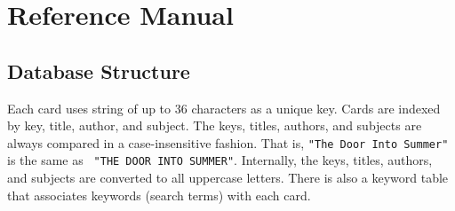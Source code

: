 \chapter{Reference Manual}
\label{chpt:Reference}

\section{Database Structure}

Each card uses string of up to 36 characters as a unique key.
Cards are indexed by key, title, author, and subject. The keys, titles,
authors, and subjects are always compared in a case-insensitive
fashion.  That is, {\tt "The Door Into Summer"} is the same as {\tt
"THE DOOR INTO SUMMER"}.  Internally, the keys, titles, authors, and
subjects are converted to all uppercase letters.  There is also a
keyword table that associates keywords (search terms) with each card.

